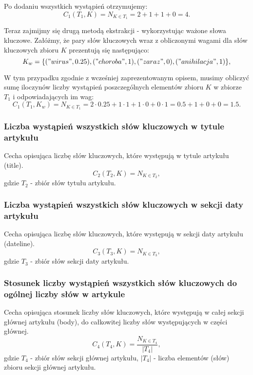 \documentclass{classrep}
\begin{document}
Po dodaniu wszystkich wystąpień otrzymujemy:
\begin{equation}
 C_{1}(T_{1},K) =  N_{K \in T_{1}} = 2+1+1+0= 4.
 \end{equation}	

Teraz zajmijmy się drugą metodą ekstrakcji - wykorzystując ważone słowa kluczowe. Załóżmy, że pary słów kluczowych wraz z obliczonymi wagami dla słów kluczowych zbioru $K$ prezentują się następująco:
\begin{equation}
K_{w} = \{{("wirus", 0.25), ("choroba", 1), ("zaraz", 0), ("anihilacja", 1)}\},
 \end{equation}	

W tym przypadku zgodnie z wcześniej zaprezentowanym opisem, musimy obliczyć sumę iloczynów liczby wystąpień poszczególnych elementów zbioru $K$ w zbiorze $T_{1}$ i odpowiadających im wag:
\begin{equation}
 C_{1}(T_{1},K_{w}) =  N_{K \in T_{1}} = 2 \cdot 0.25 + 1 \cdot 1 + 1 \cdot 0 + 0 \cdot 1 = 0.5 + 1 + 0 + 0 = 1.5.
 \end{equation}	

\subsubsection{Liczba wystąpień wszystkich słów kluczowych w tytule artykułu}
Cecha opisująca liczbę słów kluczowych, które występują w tytule artykułu (title).
\begin{equation}
            C_{2}(T_{2},K) = N_{K \in T_{2}},
 \end{equation}	
 gdzie $T_{2}$ - zbiór słów tytułu artykułu.

\subsubsection{Liczba wystąpień wszystkich słów kluczowych w sekcji daty artykułu}

Cecha opisująca liczbę słów kluczowych, które występują w sekcji daty artykułu (dateline).
\begin{equation}
            C_{3}(T_{3},K) = N_{K \in T_{3}},
 \end{equation}	
 gdzie $T_{3}$ - zbiór słów sekcji daty artykułu.

\subsubsection{Stosunek liczby wystąpień wszystkich słów kluczowych do ogólnej liczby słów w artykule}
Cecha opisująca stosunek liczby słów kluczowych, które występują w całej sekcji głównej artykułu (body), do całkowitej liczby słów występujących w części głównej.
\begin{equation}
            C_{4}(T_{4},K) = \frac{N_{K \in T_{4}}} {|T_{4}|},
 \end{equation}	
 gdzie $T_{4}$ - zbiór słów sekcji głównej artykułu, $|T_{4}|$ - liczba elementów (słów) zbioru sekcji głównej artykułu. \newline
\end{document}
